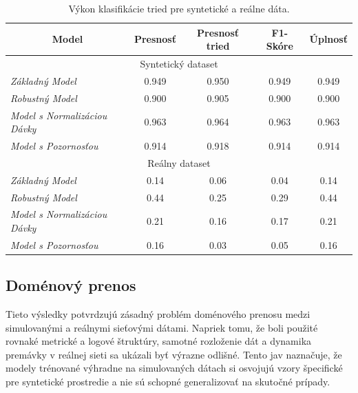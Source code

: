 \documentclass[a4paper,10pt]{ieeetran}
\begin{document}
\begin{table}
\centering
\caption{Výkon klasifikácie tried pre syntetické a reálne dáta.}
\label{table:performance}
\begin{tabular}{|lcccc|}
\hline
\multicolumn{1}{|c|}{Model} & \multicolumn{1}{c|}{Presnosť} & \multicolumn{1}{c|}{Presnosť tried} & \multicolumn{1}{c|}{F1-Skóre} & Úplnosť \\ \hline
\multicolumn{5}{|c|}{Syntetický dataset} \\ \hline
\multicolumn{1}{|l|}{\textit{Základný Model}} & \multicolumn{1}{c|}{0.949} & \multicolumn{1}{c|}{0.950} & \multicolumn{1}{c|}{0.949} & 0.949 \\ \hline
\multicolumn{1}{|l|}{\textit{Robustný Model}} & \multicolumn{1}{c|}{0.900} & \multicolumn{1}{c|}{0.905} & \multicolumn{1}{c|}{0.900} & 0.900  \\ \hline
\multicolumn{1}{|l|}{\textit{Model s Normalizáciou Dávky}} & \multicolumn{1}{c|}{0.963} & \multicolumn{1}{c|}{0.964} & \multicolumn{1}{c|}{0.963} & 0.963 \\ \hline
\multicolumn{1}{|l|}{\textit{Model s Pozornosťou}} & \multicolumn{1}{c|}{0.914} & \multicolumn{1}{c|}{0.918} & \multicolumn{1}{c|}{0.914} & 0.914 \\ \hline
\multicolumn{5}{|c|}{Reálny dataset} \\ \hline
\multicolumn{1}{|l|}{\textit{Základný Model}} & \multicolumn{1}{c|}{0.14} & \multicolumn{1}{c|}{0.06} & \multicolumn{1}{c|}{0.04} & 0.14 \\ \hline
\multicolumn{1}{|l|}{\textit{Robustný Model}} & \multicolumn{1}{c|}{0.44} & \multicolumn{1}{c|}{0.25} & \multicolumn{1}{c|}{0.29} & 0.44 \\ \hline
\multicolumn{1}{|l|}{\textit{Model s Normalizáciou Dávky}} & \multicolumn{1}{c|}{0.21} & \multicolumn{1}{c|}{0.16} & \multicolumn{1}{c|}{0.17} & 0.21 \\ \hline
\multicolumn{1}{|l|}{\textit{Model s Pozornosťou}} & \multicolumn{1}{c|}{0.16} & \multicolumn{1}{c|}{0.03} & \multicolumn{1}{c|}{0.05} & 0.16 \\ \hline
\end{tabular}
\end{table}

\subsection{Doménový prenos}

Tieto výsledky potvrdzujú zásadný problém doménového prenosu medzi simulovanými a reálnymi sieťovými dátami. Napriek tomu, že boli použité rovnaké metrické a logové štruktúry, samotné rozloženie dát a dynamika premávky v reálnej sieti sa ukázali byť výrazne odlišné. Tento jav naznačuje, že modely trénované výhradne na simulovaných dátach si osvojujú vzory špecifické pre syntetické prostredie a nie sú schopné generalizovať na skutočné prípady.
\end{document}
